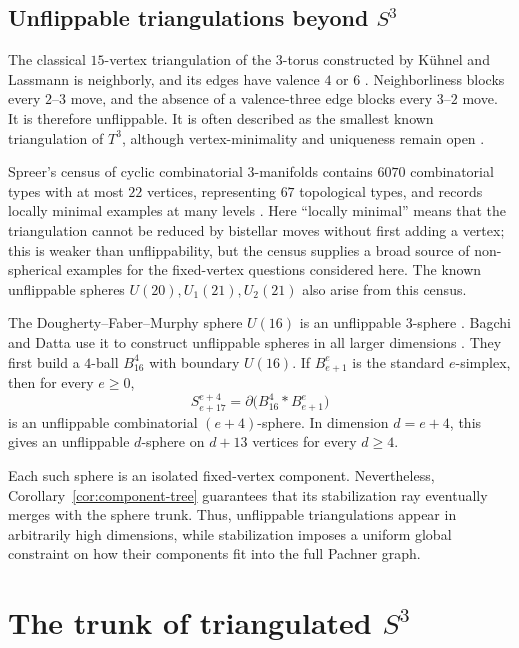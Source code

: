 \documentclass[11pt]{article}
\theoremstyle{remark}
\theoremstyle{plain}
\begin{document}
\subsection{Unflippable triangulations beyond \texorpdfstring{\(S^3\)}{S3}}

The classical \(15\)-vertex triangulation of the \(3\)-torus constructed by
K\"uhnel and Lassmann is neighborly, and its edges have valence \(4\) or
\(6\) \cite{KL84,BK12}.  Neighborliness blocks every \(2\)--\(3\) move,
and the absence of a valence-three edge blocks every \(3\)--\(2\) move.
It is therefore unflippable.  It is often described as the smallest known
triangulation of \(T^3\), although vertex-minimality and uniqueness remain
open \cite{L09,BK12}.

Spreer's census of cyclic combinatorial \(3\)-manifolds contains \(6070\)
combinatorial types with at most \(22\) vertices, representing \(67\)
topological types, and records locally minimal examples at many levels
\cite{S14}.  Here ``locally minimal'' means that the triangulation cannot be
reduced by bistellar moves without first adding a vertex; this is weaker than
unflippability, but the census supplies a broad source of non-spherical
examples for the fixed-vertex questions considered here.  The known
unflippable spheres \(U(20),U_1(21),U_2(21)\) also arise from this census.

The Dougherty--Faber--Murphy sphere \(U(16)\) is an unflippable
\(3\)-sphere \cite{DFM04}.  Bagchi and Datta use it to construct
unflippable spheres in all larger dimensions \cite{BD13}.  They first build a
\(4\)-ball \(B^4_{16}\) with boundary \(U(16)\).  If
\(B^e_{e+1}\) is the standard \(e\)-simplex, then for every \(e\ge0\),
\[
 S^{e+4}_{e+17}
 =\partial\bigl(B^4_{16}*B^e_{e+1}\bigr)
\]
is an unflippable combinatorial \((e+4)\)-sphere.  In dimension \(d=e+4\),
this gives an unflippable \(d\)-sphere on \(d+13\) vertices for every
\(d\ge4\).

Each such sphere is an isolated fixed-vertex component.  Nevertheless, Corollary~\ref{cor:component-tree} guarantees that its stabilization
ray eventually
merges with the sphere trunk.  Thus, unflippable triangulations
appear in arbitrarily high dimensions, while stabilization imposes a uniform
global constraint on how their components fit into the full Pachner graph.

\section{The trunk of triangulated \texorpdfstring{\(S^3\)}{S3}}
\label{sec:s3}
\end{document}
